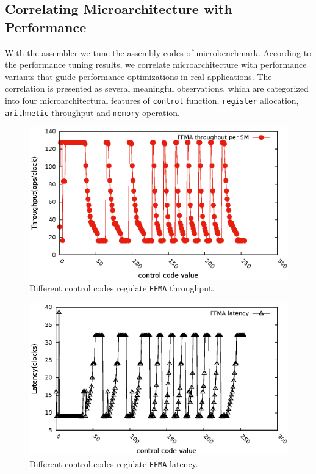 \documentclass{sig-alternate-05-2015}
\begin{document}
\subsection{Correlating Microarchitecture with Performance}
With the assembler we tune the assembly codes of microbenchmark. According to the performance tuning results, we correlate microarchitecture with performance variants that guide performance optimizations in real applications. The correlation is presented as several meaningful observations, which are categorized into four microarchitectural features of {\tt control} function, {\tt register} allocation, {\tt arithmetic} throughput and {\tt memory} operation.

\begin{figure}[htbp]
\begin{center}
\includegraphics[scale=0.5]{ctrl}
\caption{Different control codes regulate {\tt FFMA} throughput.}
\label{fig:control_thoughput}
\end{center}
\end{figure}

\begin{figure}[htbp]
\begin{center}
\includegraphics[scale=0.5]{ctrl_latency}
\caption{Different control codes regulate {\tt FFMA} latency.}
\label{fig:control_latency}
\end{center}
\end{figure}
\end{document}
